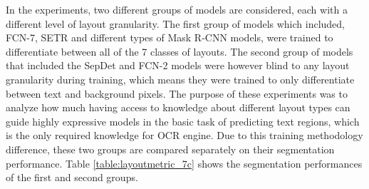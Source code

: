 \documentclass[letterpaper]{article} %
\begin{document}
In the experiments, two different groups of models are considered, each with a different level of layout granularity. The first group of models which included, FCN-7, SETR and different types of Mask R-CNN models, were trained to differentiate between all of the 7 classes of layouts. The second group of models that included the SepDet and FCN-2 models were however blind to any layout granularity during training, which means they were trained to only differentiate between text and background pixels. The purpose of these experiments was to analyze how much having access to knowledge about different layout types can guide highly expressive models in the basic task of predicting text regions, which is the only required knowledge for OCR engine. Due to this training methodology difference, these two groups are compared separately on their segmentation performance. Table  \ref{table:layoutmetric_7c}  
shows the segmentation performances of the first and second groups.
\end{document}
